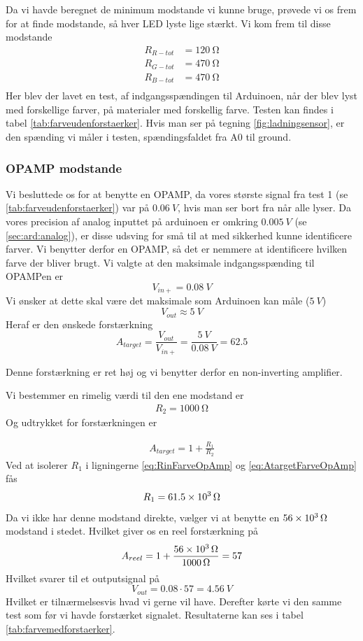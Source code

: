 Da vi havde beregnet de minimum modstande vi kunne bruge, prøvede vi os frem for at finde modstande, så hver LED lyste lige stærkt. Vi kom frem til disse modstande
\begin{align}
	R_{R-tot} &= \SI{120}{\ohm}\\
	R_{G-tot} &= \SI{470}{\ohm}\\
	R_{B-tot} &= \SI{470}{\ohm}\\
\end{align}
Her blev der lavet en test, af indgangsspændingen til Arduinoen, når der blev lyst med forskellige farver, på materialer med forskellig farve. Testen kan findes i tabel \ref{tab:farveudenforstaerker}. Hvis man ser på tegning \ref{fig:ladningsensor}, er den spænding vi måler i testen, spændingsfaldet fra A0 til ground.

\subsubsection{OPAMP modstande} \label{subs:opampanalog}
Vi besluttede os for at benytte en OPAMP, da vores største signal fra test 1 (se \ref{tab:farveudenforstaerker}) var på $\SI{0.06}{V}$, hvis man ser bort fra når alle lyser. Da vores precision af analog inputtet på arduinoen er omkring $\SI{0.005}{V}$ (se \ref{sec:ard:analog}), er disse udsving for små til at med sikkerhed kunne identificere farver. Vi benytter derfor en OPAMP, så det er nemmere at identificere hvilken farve der bliver brugt.
Vi valgte at den maksimale indgangsspænding til OPAMPen er
\[
	V_{in+} = \SI{0.08}{V}
\]
Vi ønsker at dette skal være det maksimale som Arduinoen kan måle ($\SI{5}{V}$)
\[
	V_{out} \approx \SI{5}{V}
\]
Heraf er den ønskede forstærkning
\[
	A_{target} = \frac{V_{out}}{V_{in+}} = \frac{\SI{5}{V}}{\SI{0.08}{V}}=62.5
\]

Denne forstærkning er ret høj og vi benytter derfor en non-inverting amplifier.

Vi bestemmer en rimelig værdi til den ene modstand er
\begin{align}
	R_{2} = \SI{1000}{\ohm} \label{eq:RinFarveOpAmp}
\end{align}
Og udtrykket for forstærkningen er

\begin{align}
	A_{target} = 1+\frac{R_1}{R_2} \label{eq:AtargetFarveOpAmp}
\end{align}
Ved at isolerer $R_1$ i ligningerne \ref{eq:RinFarveOpAmp} og \ref{eq:AtargetFarveOpAmp} fås
\[
	R_1 = \SI{61.5d3}{\ohm}
\]
Da vi ikke har denne modstand direkte, vælger vi at benytte en $\SI{56d3}{\ohm}$ modstand i stedet. Hvilket giver os en reel forstærkning på
\[
	A_{reel} = 1 + \frac{\SI{56d3}{\ohm}}{\SI{1000}{\ohm}} = 57	
\]
Hvilket svarer til et outputsignal på
\[
	V_{out} = \SI{0.08}\cdot 57 = \SI{4.56}{V}
\]
Hvilket er tilnærmelsesvis hvad vi gerne vil have. Derefter kørte vi den samme test som før vi havde forstærket signalet. Resultaterne kan ses i tabel \ref{tab:farvemedforstaerker}.





